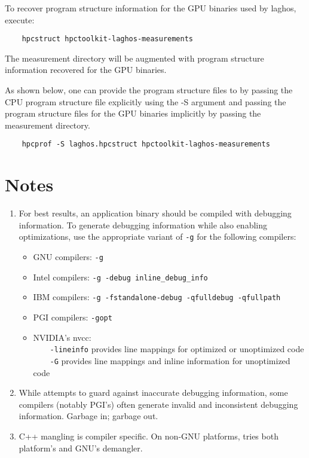 \documentclass[english]{article}
\begin{document}
\begin{enumerate}
To recover program structure information for the GPU binaries used by laghos, execute:

\begin{verbatim}
    hpcstruct hpctoolkit-laghos-measurements
\end{verbatim}

The measurement directory will be augmented with program structure information recovered for the GPU binaries.

As shown below, one can provide the program structure files to  by passing the 
CPU program structure file explicitly using the -S argument and passing the program structure files for the GPU binaries
implicitly by passing the measurement directory. 

\begin{verbatim}
    hpcprof -S laghos.hpcstruct hpctoolkit-laghos-measurements
\end{verbatim}

\end{enumerate}

\section{Notes}

\begin{enumerate}

\item For best results, an application binary should be compiled with debugging information.
To generate debugging information while also enabling optimizations,
use the appropriate variant of \verb+-g+ for the following compilers:
\begin{itemize}
\item GNU compilers: \verb+-g+
\item Intel compilers: \verb+-g -debug inline_debug_info+
\item IBM compilers: \verb+-g -fstandalone-debug -qfulldebug -qfullpath+
\item PGI compilers: \verb+-gopt+
\item NVIDIA's nvcc: \\
~~~~\verb+-lineinfo+ provides line mappings for optimized or unoptimized code\\
~~~~\verb+-G+ provides line mappings and inline information for unoptimized code
\end{itemize}

\item While  attempts to guard against inaccurate debugging information,
some compilers (notably PGI's) often generate invalid and inconsistent debugging information.
Garbage in; garbage out.

\item C++ mangling is compiler specific. On non-GNU platforms, 
tries both platform's and GNU's demangler.

\end{enumerate}
\end{document}
